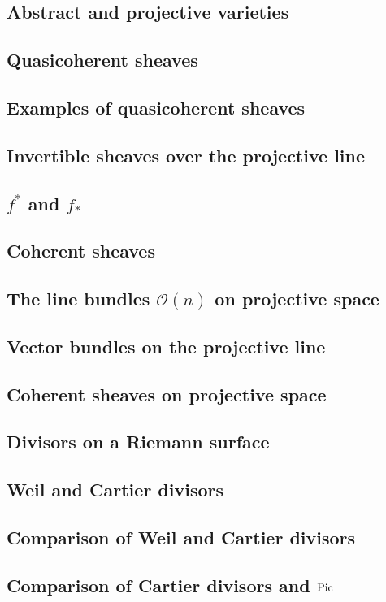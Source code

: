 \documentclass [11 pt, oneside] {article}
\begin{document}
\subsection{Abstract and projective varieties}
\subsection{Quasicoherent sheaves}
\subsection{Examples of quasicoherent sheaves}
\subsection{Invertible sheaves over the projective line}
\subsection{\texorpdfstring{$f^*$}{f*} and \texorpdfstring{$f_*$}{f*}}
\subsection{Coherent sheaves}
\subsection[Line bundles on projective space]{The line bundles \texorpdfstring{$\mathscr O(n)$}{O(n)} on projective space}
\subsection{Vector bundles on the projective line}
\subsection{Coherent sheaves on projective space}
\subsection{Divisors on a Riemann surface}
\subsection{Weil and Cartier divisors}
\subsection{Comparison of Weil and Cartier divisors}
\subsection[Comparison of Cartier divisors and Pic]{Comparison of Cartier divisors and $\operatorname{Pic}$}
\end{document}
